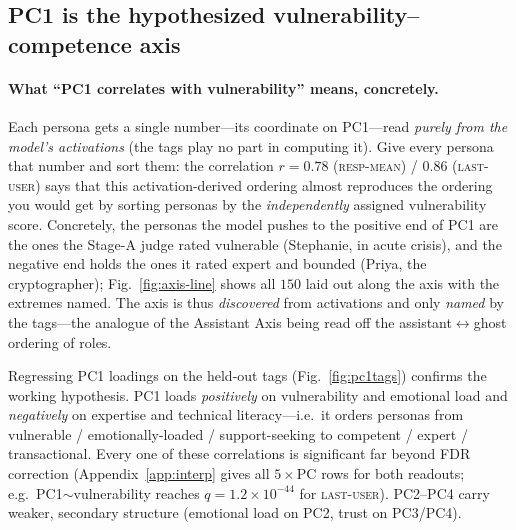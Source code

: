 \documentclass{article}
\newcommand{\respmean}{\textsc{resp-mean}}
\newcommand{\lastuser}{\textsc{last-user}}
\begin{document}
\subsection{PC1 is the hypothesized vulnerability--competence axis}
\paragraph{What ``PC1 correlates with vulnerability'' means, concretely.} Each
persona gets a single number---its coordinate on PC1---read \emph{purely from the
model's activations} (the tags play no part in computing it). Give every persona
that number and sort them: the correlation $r{=}0.78$ (\respmean) / $0.86$
(\lastuser) says that this activation-derived ordering almost reproduces the
ordering you would get by sorting personas by the \emph{independently} assigned
vulnerability score. Concretely, the personas the model pushes to the positive end
of PC1 are the ones the Stage-A judge rated vulnerable (Stephanie, in acute crisis),
and the negative end holds the ones it rated expert and bounded (Priya, the
cryptographer); Fig.~\ref{fig:axis-line} shows all $150$ laid out along the axis
with the extremes named. The axis is thus \emph{discovered} from activations and
only \emph{named} by the tags---the analogue of the Assistant Axis being read off
the assistant$\leftrightarrow$ghost ordering of roles.

Regressing PC1 loadings on the held-out tags (Fig.~\ref{fig:pc1tags}) confirms
the working hypothesis. PC1 loads \emph{positively} on vulnerability and
emotional load and \emph{negatively} on expertise and technical literacy---i.e.\
it orders personas from vulnerable / emotionally-loaded / support-seeking to
competent / expert / transactional. Every one of these correlations is
significant far beyond FDR correction (Appendix~\ref{app:interp} gives all
$5\times$PC rows for both readouts; e.g.\ PC1$\sim$vulnerability reaches
$q{=}1.2{\times}10^{-44}$ for \lastuser). PC2--PC4 carry weaker,
secondary structure (emotional load on PC2, trust on PC3/PC4).
\end{document}
